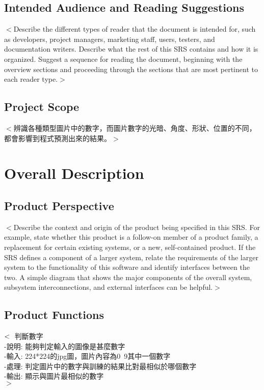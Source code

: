 \documentclass{scrreprt}
\begin{document}
\begin{CJK*}{UTF8}{bsmi}
\section{Intended Audience and Reading Suggestions}
$<$Describe the different types of reader that the document is intended for, 
such as developers, project managers, marketing staff, users, testers, and 
documentation writers. Describe what the rest of this SRS contains and how it is 
organized. Suggest a sequence for reading the document, beginning with the 
overview sections and proceeding through the sections that are most pertinent to 
each reader type.$>$

\section{Project Scope}
$<$辨識各種類型圖片中的數字，而圖片數字的光暗、角度、形狀、位置的不同，都會影響到程式預測出來的結果。$>$


\chapter{Overall Description}

\section{Product Perspective}
$<$Describe the context and origin of the product being specified in this SRS.  
For example, state whether this product is a follow-on member of a product 
family, a replacement for certain existing systems, or a new, self-contained 
product. If the SRS defines a component of a larger system, relate the 
requirements of the larger system to the functionality of this software and 
identify interfaces between the two. A simple diagram that shows the major 
components of the overall system, subsystem interconnections, and external 
interfaces can be helpful.$>$

\section{Product Functions}
$<\\$
\hspace{2cm}判斷數字\\
\hspace{4cm}-說明: 能夠判定輸入的圖像是甚麼數字\\
\hspace{4cm}-輸入: 224*224的jpg圖，圖片內容為0~9其中一個數字\\
\hspace{4cm}-處理: 判定圖片中的數字與訓練的結果比對最相似於哪個數字\\
\hspace{4cm}-輸出: 顯示與圖片最相似的數字\\$>$


\end{CJK*}
\end{document}
